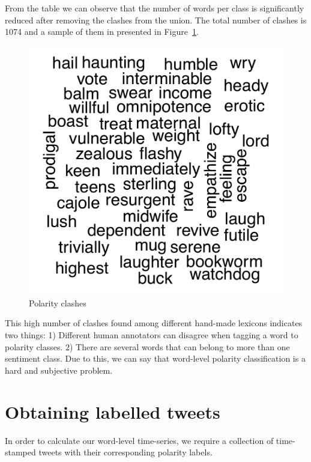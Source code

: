 \documentclass{sig-alternate}
\begin{document}
From the table we can observe that the number of words per class is significantly reduced after removing the clashes from the union. The total number of clashes is 1074 and a sample of them in presented in Figure~\ref{fig:word_clash}. 
\begin{figure}[ht]
	\centering
	\includegraphics[scale=0.3]{clashes.pdf}
	\caption{Polarity clashes}
	\label{fig:word_clash}
\end{figure}


This high number of clashes found among different hand-made lexicons indicates two things: 1) Different human annotators can disagree when tagging a word to polarity classes. 2) There are several words that can belong to more than one sentiment class.  
Due to this, we can say that word-level polarity classification is a hard and subjective problem.  




\section{Obtaining labelled tweets}\label{sec:tweetlab}

In order to calculate our word-level time-series, we require a collection of time-stamped tweets with their corresponding polarity labels. 
\end{document}
